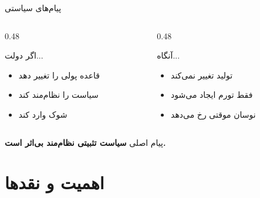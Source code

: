\documentclass[aspectratio=169,11pt]{beamer}
\newcommand{\important}[1]{\textcolor{AlertRed}{\textbf{#1}}}
\begin{document}
\begin{frame}{پیام‌های سیاستی}
	\begin{LTR}
		\begin{columns}[T]
			\begin{column}{0.48\textwidth}
				\begin{RTL}
					\begin{alertblock}{اگر دولت...}
						\begin{itemize}
							\item قاعده پولی را تغییر دهد
							\item سیاست را نظام‌مند کند
							\item شوک وارد کند
						\end{itemize}
					\end{alertblock}
				\end{RTL}
			\end{column}
			\hfill
			\begin{column}{0.48\textwidth}
				\begin{RTL}
					\begin{exampleblock}{آنگاه...}
						\begin{itemize}
							\item تولید تغییر نمی‌کند
							\item فقط تورم ایجاد می‌شود
							\item نوسان موقتی رخ می‌دهد
						\end{itemize}
					\end{exampleblock}
				\end{RTL}
			\end{column}
		\end{columns}
	\end{LTR}
	\vspace{0.4cm}
	\begin{block}{پیام اصلی}
		\centering
		\large
		\important{سیاست تثبیتی نظام‌مند بی‌اثر است.}
	\end{block}
\end{frame}

\section{اهمیت و نقدها}
\end{document}
